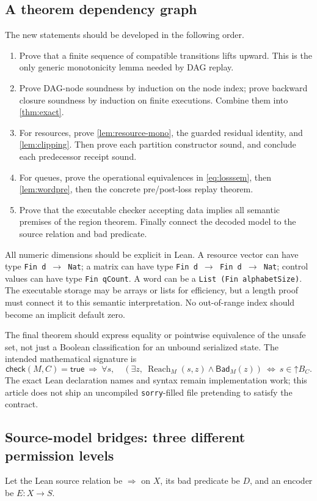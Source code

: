 \documentclass[11pt,a4paper]{article}
\theoremstyle{definition}
\newcommand{\Up}[1]{\mathord{\uparrow}#1}
\newcommand{\Bad}{\mathsf{Bad}}
\newcommand{\Reach}{\operatorname{Reach}}
\newcommand{\code}[1]{\texttt{#1}}
\begin{document}
\subsection{A theorem dependency graph}
The new statements should be developed in the following order.
\begin{enumerate}[leftmargin=2em]
\item Prove that a finite sequence of compatible transitions lifts upward.
This is the only generic monotonicity lemma needed by DAG replay.
\item Prove DAG-node soundness by induction on the node index; prove backward
closure soundness by induction on finite executions. Combine them into
\cref{thm:exact}.
\item For resources, prove \cref{lem:resource-mono}, the guarded residual
identity, and \cref{lem:clipping}. Then prove each partition constructor
sound, and conclude each predecessor receipt sound.
\item For queues, prove the operational equivalences in \eqref{eq:losssem},
then \cref{lem:wordpre}, then the concrete pre/post-loss replay theorem.
\item Prove that the executable checker accepting data implies all semantic
premises of the region theorem. Finally connect the decoded model to the
source relation and bad predicate.
\end{enumerate}

All numeric dimensions should be explicit in Lean. A resource vector can have
type \code{Fin d $\to$ Nat}; a matrix can have type
\code{Fin d $\to$ Fin d $\to$ Nat}; control values can have type
\code{Fin qCount}. A word can be a \code{List (Fin alphabetSize)}.
The executable storage may be arrays or lists for efficiency, but a length
proof must connect it to this semantic interpretation. No out-of-range index
should become an implicit default zero.

The final theorem should express equality or pointwise equivalence of the
unsafe set, not just a Boolean classification for an unbound serialized
state. The intended mathematical signature is
\[
 \mathsf{check}(M,C)=\mathsf{true}
 \ \Longrightarrow\
 \forall s,\quad
 (\exists z,\ \Reach_M(s,z)\land\Bad_M(z))
 \ \Longleftrightarrow\ s\in\Up{B_C}.
\]
The exact Lean declaration names and syntax remain implementation work; this
article does not ship an uncompiled \code{sorry}-filled file pretending to
satisfy the contract.

\subsection{Source-model bridges: three different permission levels}
Let the Lean source relation be $\Rightarrow$ on $X$, its bad predicate be
$D$, and an encoder be $E:X\to S$.
\end{document}
